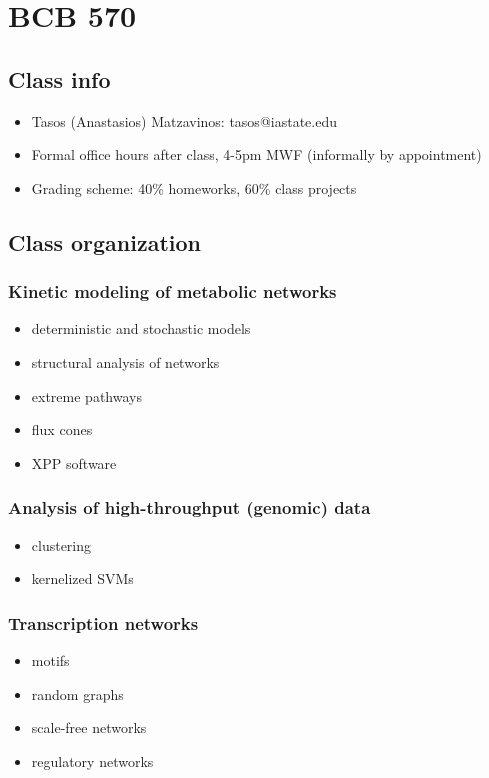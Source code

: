\documentclass[10pt]{article}
\newenvironment{mitemize}
{
  \begin{itemize}
  \setlength{\itemsep}{1pt}
  \setlength{\parskip}{0pt}
  \setlength{\parsep}{0pt}}{\end{itemize}
}
\begin{document}
\section*{BCB 570}
\subsection*{Class info}
\begin{mitemize}
  \item Tasos (Anastasios) Matzavinos: tasos@iastate.edu
  \item Formal office hours after class, 4-5pm MWF (informally by appointment)
  \item Grading scheme: 40\% homeworks, 60\% class projects
\end{mitemize}

\subsection*{Class organization}

\subsubsection{Kinetic modeling of metabolic networks}
\begin{mitemize}
  \item deterministic and stochastic models
  \item structural analysis of networks
  \item extreme pathways
  \item flux cones
  \item XPP software
\end{mitemize}

\subsubsection{Analysis of high-throughput (genomic) data}
\begin{mitemize}
  \item clustering
  \item kernelized SVMs
\end{mitemize}

\subsubsection{Transcription networks}
\begin{mitemize}
  \item motifs
  \item random graphs
  \item scale-free networks
  \item regulatory networks
\end{mitemize}
\end{document}
